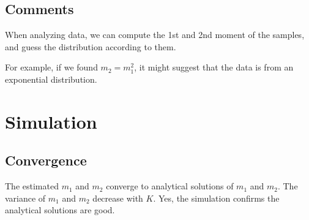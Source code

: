 \subsection*{Comments}
When analyzing data, we can compute the 1st and 2nd moment of the samples, and guess the distribution according to them.

For example, if we found $m_2 = m_1^2$, it might suggest that the data is from an exponential distribution.

\section{Simulation}


\subsection*{Convergence}
The estimated $m_1$ and $m_2$ converge to analytical solutions of $m_1$ and $m_2$.
The variance of $m_1$ and $m_2$ decrease with $K$.
Yes, the simulation confirms the analytical solutions are good.


